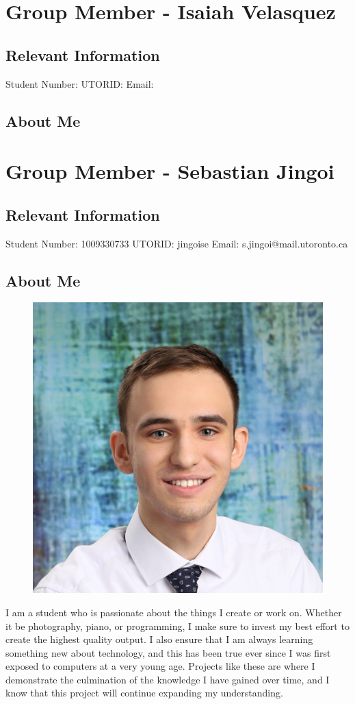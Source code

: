\documentclass{article}
\begin{document}
\section{Group Member - Isaiah Velasquez}
\subsection{Relevant Information}
    Student Number:   \newline
    UTORID:  \newline
    Email: 
\subsection{About Me}

\noindent\makebox[\linewidth]{\rule{\paperwidth}{0.4pt}}

\section{Group Member - Sebastian Jingoi}
\subsection{Relevant Information}
    Student Number: 1009330733 \newline
    UTORID: jingoise \newline
    Email: s.jingoi@mail.utoronto.ca
\subsection{About Me}
\begin{figure}[h]
    \centering
    \includegraphics[width=0.25\linewidth]{images/SebPhoto.jpg}
\end{figure}
I am a student who is passionate about the things I create or work on. Whether it be photography, piano, or programming, I make sure to invest my best effort to create the highest quality output. I also ensure that I am always learning something new about technology, and this has been true ever since I was first exposed to computers at a very young age. Projects like these are where I demonstrate the culmination of the knowledge I have gained over time, and I know that this project will continue expanding my understanding.
\end{document}
